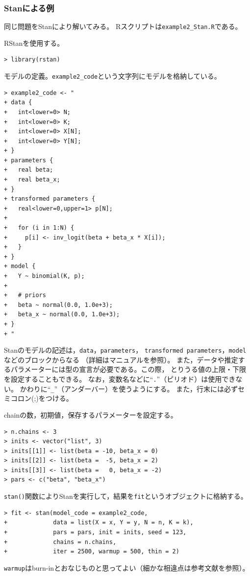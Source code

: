\documentclass[11pt,uplatex]{jsarticle}
\begin{document}
\pagebreak

\subsubsection{Stanによる例}
同じ問題を\textsf{Stan}により解いてみる。
\textsf{R}スクリプトは\texttt{example2\_Stan.R}である。

RStanを使用する。
\begin{lstlisting}
> library(rstan)
\end{lstlisting}

モデルの定義。\texttt{example2\_code}という文字列にモデルを格納している。
\begin{lstlisting}
> example2_code <- "
+ data {
+   int<lower=0> N;
+   int<lower=0> K;
+   int<lower=0> X[N];
+   int<lower=0> Y[N];
+ }
+ parameters {
+   real beta;
+   real beta_x;
+ }
+ transformed parameters {
+   real<lower=0,upper=1> p[N];
+ 
+   for (i in 1:N) {
+     p[i] <- inv_logit(beta + beta_x * X[i]);
+   }
+ }
+ model {
+   Y ~ binomial(K, p);
+   
+   # priors
+   beta ~ normal(0.0, 1.0e+3);
+   beta_x ~ normal(0.0, 1.0e+3);
+ }
+ "
\end{lstlisting}
\noindent
Stanのモデルの記述は，\texttt{data}，\texttt{parameters}，
\texttt{transformed parameters}，\texttt{model}などのブロックからなる
（詳細はマニュアルを参照）。
また，データや推定するパラメーターには型の宣言が必要である。この際，
とりうる値の上限・下限を設定することもできる。
なお，変数名などに``\texttt{.}''（ピリオド）は使用できない。
かわりに``\texttt{\_}''（アンダーバー）を使うようにする。
また，行末には必ずセミコロン(;)をつける。

chainの数，初期値，保存するパラメーターを設定する。
\begin{lstlisting}
> n.chains <- 3
> inits <- vector("list", 3)
> inits[[1]] <- list(beta = -10, beta_x = 0)
> inits[[2]] <- list(beta =  -5, beta_x = 2)
> inits[[3]] <- list(beta =   0, beta_x = -2)
> pars <- c("beta", "beta_x")
\end{lstlisting}
\texttt{stan()}関数によりStanを実行して，結果を\texttt{fit}というオブジェクトに格納する。
\begin{lstlisting}
> fit <- stan(model_code = example2_code,
+             data = list(X = x, Y = y, N = n, K = k),
+             pars = pars, init = inits, seed = 123,
+             chains = n.chains,
+             iter = 2500, warmup = 500, thin = 2)
\end{lstlisting}
\noindent
\texttt{warmup}はburn-inとおなじものと思ってよい（細かな相違点は参考文献\cite{BDA3}を参照）。
\end{document}
